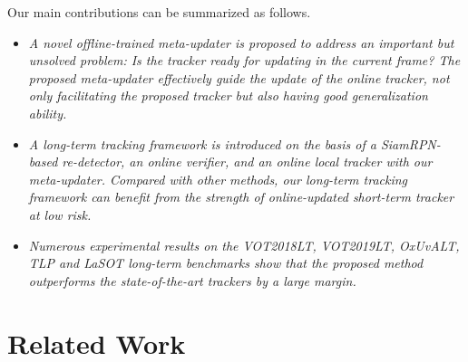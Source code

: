 \documentclass[10pt,twocolumn,letterpaper]{article}
\begin{document}
Our main contributions can be summarized as follows.
\vspace{-3mm}
\begin{itemize}
\setlength{\itemsep}{0pt}
\setlength{\parsep}{0pt}
\setlength{\parskip}{0pt}
\item \emph{A novel offline-trained meta-updater is proposed to address an important
but unsolved problem: Is the tracker ready for updating in the current frame?
The proposed meta-updater effectively guide the update of the online tracker, not only
facilitating the proposed tracker but also having good generalization ability.}
\item \emph{A long-term tracking framework is introduced on the basis of
a SiamRPN-based re-detector, an online verifier, and an online local tracker with our
meta-updater.  Compared with other methods, our long-term tracking framework
can benefit from the strength of online-updated short-term tracker at low risk.}
\item \emph{Numerous experimental results on the VOT2018LT, VOT2019LT,
OxUvALT, TLP and LaSOT long-term benchmarks show that the proposed
method outperforms the state-of-the-art trackers by a large margin. }
\end{itemize}

\vspace{-4mm}
\section{Related Work}
\vspace{-2mm}
\end{document}
